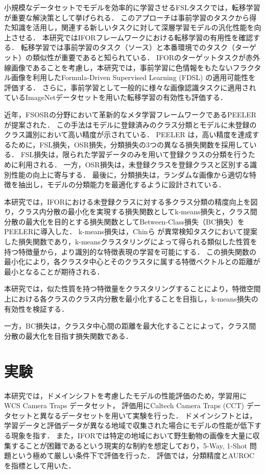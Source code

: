 \documentclass[uplatex,dvipdfmx,10pt,twocolumn]{jsarticle}
\begin{document}
小規模なデータセットでモデルを効率的に学習させるFSLタスクでは，転移学習が重要な解決策として挙げられる．
このアプローチは事前学習のタスクから得た知識を活用し，関連する新しいタスクに対して深層学習モデルの汎化性能を向上させる．
本研究ではIFORフレームワークにおける転移学習の有用性を確認する．
転移学習では事前学習のタスク（ソース）と本番環境でのタスク（ターゲット）の類似性が重要であると知られている．
IFORのターゲットタスクが赤外線画像であることを考慮し，本研究では，事前学習に色情報をもたないフラクタル画像を利用したFormula-Driven Supervised Learning (FDSL) の適用可能性を評価する．
さらに，事前学習として一般的に様々な画像認識タスクに適用されているImageNetデータセットを用いた転移学習の有効性も評価する．

近年，FSOSRの分野において革新的なメタ学習フレームワークであるPEELER \cite{peeler}が提案された．
この手法はモデルに登録済みのクラス分類とモデルに未登録のクラス識別において高い精度が示されている．
PEELER は，高い精度を達成するために，FSL損失，OSR損失，分類損失の3つの異なる損失関数を採用している．
FSL損失は，限られた学習データのみを用いて登録クラスの分類を行うために利用される．
一方，OSR損失は，未登録クラスを登録クラスと区別する識別性能の向上に寄与する．
最後に，分類損失は，ランダムな画像から適切な特徴を抽出し，モデルの分類能力を最適化するように設計されている．

本研究では，IFORにおける未登録クラスに対する多クラス分類の精度向上を図り，クラス内分散の最小化を実現する損失関数としてk-means損失と，クラス間分散の最大化を目的とする損失関数としてBetween-Class損失（BC損失）をPEELERに導入した．
k-means損失は，Chinら \cite{k-means}が異常検知タスクにおいて提案した損失関数であり，k-meansクラスタリングによって得られる類似した性質を持つ特徴量から，より識別的な特徴表現の学習を可能にする．
この損失関数の最小化により，各クラスタ中心とそのクラスタに属する特徴ベクトルとの距離が最小となることが期待される．

本研究では，似た性質を持つ特徴量をクラスタリングすることにより，特徴空間上における各クラスのクラス内分散を最小化することを目指し，k-means損失の有効性を検証する．

一方，BC損失は，クラスタ中心間の距離を最大化することによって，クラス間分散の最大化を目指す損失関数である．

\section{実験}

本研究では，ドメインシフトを考慮したモデルの性能評価のため，学習用にWCS Camera Traps データセット，
評価用にCaltech Camera Traps (CCT) データセットと異なるデータセットを用いて実験を行った．
ドメインシフトとは，学習データと評価データが異なる地域で収集された場合にモデルの性能が低下する現象を指す．
また，IFORでは特定の地域において野生動物の画像を大量に収集することが困難であるという現実的な制約を想定しており，5-Way, 1-Shot 問題という極めて厳しい条件下で評価を行った．
評価では，分類精度とAUROCを指標として用いた．
\end{document}
